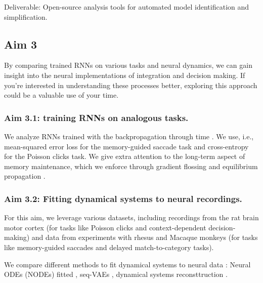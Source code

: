 \documentclass[12pt,letterpaper, onecolumn]{article}
\theoremstyle{definition}
\theoremstyle{remark}
\begin{document}


Deliverable: Open-source analysis tools for automated model identification and simplification.









\subsection*{Aim 3}

By comparing trained RNNs on various tasks and neural dynamics, we can gain insight into the neural implementations of integration and decision making. If you're interested in understanding these processes better, exploring this approach could be a valuable use of your time.



\subsubsection*{Aim 3.1: training RNNs on analogous tasks.}
We analyze RNNs trained with the backpropagation through time \citep{farrell2022, schuessler2020}.
We use, i.e., mean-squared error loss for the memory-guided saccade task and cross-entropy for the Poisson clicks task.
We give extra attention to the long-term aspect of memory maintenance, which we enforce through gradient flossing \citep{engelken2023b} and equilibrium propagation \citep{laborieux2023}.





\subsubsection*{Aim 3.2: Fitting dynamical systems to neural recordings.}

For this aim, we leverage various datasets, including recordings from the rat brain motor cortex (for tasks like Poisson clicks and context-dependent decision-making) and data from experiments with rhesus and Macaque monkeys (for tasks like memory-guided saccades and delayed match-to-category tasks).

 

We compare different methods to fit dynamical systems to neural data \citep{zhao2016}:
 Neural ODEs (NODEs) fitted \citep{kim2021inferring},
 seq-VAEs \citep{pandarinath2018inferring},
dynamical systems reconsttruction \citep{schmidt2019}.
\end{document}
